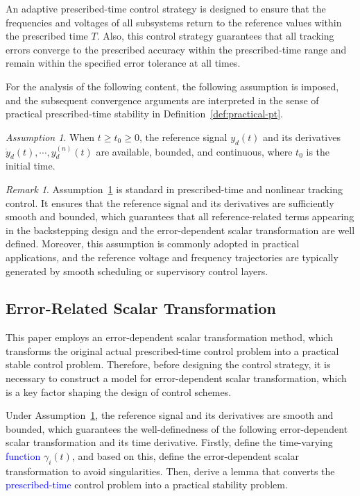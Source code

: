 \documentclass[]{interact}
\theoremstyle{plain}%
\theoremstyle{definition}
\theoremstyle{remark}
\newtheorem{remark}{Remark}
\begin{document}
An adaptive prescribed-time control strategy is designed to ensure that the frequencies and voltages of all subsystems return to the reference values within the prescribed time \( T \). Also, this control strategy guarantees that all tracking errors converge to the prescribed accuracy within the prescribed-time range and remain within the specified error tolerance at all times. 

For the analysis of the following content, the following assumption is imposed, and the subsequent convergence arguments are interpreted in the sense of practical prescribed-time stability in Definition~\ref{def:practical-pt}.     

\newtheorem{assumption}{Assumption}
\begin{assumption} 
\label{assump:1}
When \( t \geq t_0 \geq 0 \), the reference signal \( y_d(t) \) and its derivatives  \( \dot{y}_d(t), \cdots, y_d^{(n)}(t) \) are available, bounded, and continuous, where \( t_0 \) is the initial time.
\end{assumption} 

\begin{remark}
Assumption~\ref{assump:1} is standard in prescribed-time and nonlinear tracking control.
It ensures that the reference signal and its derivatives are sufficiently smooth
and bounded, which guarantees that all reference-related terms appearing in the
backstepping design and the error-dependent scalar transformation are well defined. Moreover, this assumption is commonly adopted in practical applications, and the reference voltage and frequency trajectories are typically generated by smooth scheduling
or supervisory control layers.
\end{remark}


\subsection{Error-Related Scalar Transformation}
This paper employs an error-dependent scalar transformation method, which transforms the original actual prescribed-time control problem into a practical stable control problem. Therefore, before designing the control strategy, it is necessary to construct a model for error-dependent scalar transformation, which is a key factor shaping the design of control schemes. 

Under Assumption~\ref{assump:1}, the reference signal and its derivatives are smooth and bounded, which guarantees the well-definedness of the following error-dependent scalar transformation and its time derivative.
Firstly, define the time-varying \textcolor{blue}{function} $\gamma_i(t)$, and based on this, define the error-dependent scalar transformation to avoid singularities. Then, derive a lemma that converts the \textcolor{blue}{prescribed-time} control problem into a practical stability problem.
\end{document}
